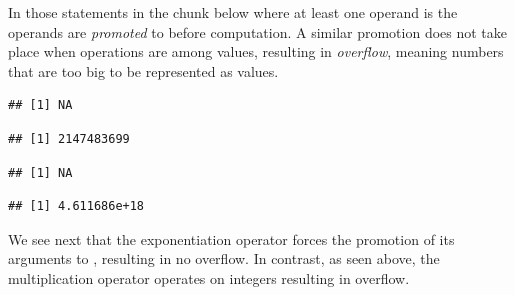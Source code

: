 \documentclass[krantz2]{krantz}\usepackage{knitr}
\begin{document}
\begin{explainbox}
In those statements in the chunk below where at least one operand is  the  operands are \emph{promoted} to  before computation. A similar promotion does not take place when operations are among  values, resulting in \emph{overflow}, meaning numbers that are too big to be represented as  values.

\begin{knitrout}\footnotesize
{}\color{fgcolor}\begin{kframe}
\begin{alltt}
 \hlopt{+} 
\end{alltt}


{\ttfamily\noindent\color{warningcolor}{\#\# Warning in 2147483600L + 99L: NAs produced by integer overflow}}\begin{verbatim}
## [1] NA
\end{verbatim}
\begin{alltt}
 \hlopt{+} 
\end{alltt}
\begin{verbatim}
## [1] 2147483699
\end{verbatim}
\begin{alltt}
 \hlopt{*} 
\end{alltt}


{\ttfamily\noindent\color{warningcolor}{\#\# Warning in 2147483600L * 2147483600L: NAs produced by integer overflow}}\begin{verbatim}
## [1] NA
\end{verbatim}
\begin{alltt}
 \hlopt{*} 
\end{alltt}
\begin{verbatim}
## [1] 4.611686e+18
\end{verbatim}
\end{kframe}
\end{knitrout}

We see next that the exponentiation operator \Roperator{\^{}} forces the promotion of its arguments to , resulting in no overflow. In contrast, as seen above, the multiplication operator \Roperator{*} operates on integers resulting in overflow.


\end{explainbox}
\end{document}
